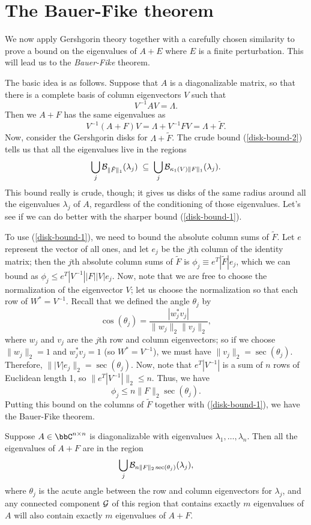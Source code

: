 \section{The Bauer-Fike theorem}

We now apply Gershgorin theory together with a carefully chosen
similarity to prove a bound on the eigenvalues of $A+E$ where $E$ is a
finite perturbation.  This will lead us to the {\em Bauer-Fike} theorem.

The basic idea is as follows.  Suppose that $A$ is a diagonalizable matrix, so
that there is a complete basis of column eigenvectors $V$ such that
\[
  V^{-1} A V = \Lambda.
\]
Then we $A+F$ has the same eigenvalues as
\[
  V^{-1} (A+F) V = \Lambda + V^{-1} F V = \Lambda + \tilde{F}.
\]
Now, consider the Gershgorin disks for $\Lambda + \tilde{F}$.
The crude bound (\ref{disk-bound-2}) tells us
that all the eigenvalues live in the regions
\[
  \bigcup_j \mathcal{B}_{\|\tilde{F}\|_1}(\lambda_j) \; \subseteq \;
  \bigcup_j \mathcal{B}_{\kappa_1(V) \|F\|_1}(\lambda_j).
\]
This bound really is crude, though; it gives us disks of the
same radius around all the eigenvalues $\lambda_j$ of $A$,
regardless of the conditioning of those eigenvalues.  Let's
see if we can do better with the sharper bound (\ref{disk-bound-1}).

To use (\ref{disk-bound-1}), we need to bound
the absolute column sums of $\tilde{F}$.  Let $e$ represent
the vector of all ones, and let $e_j$ be the $j$th column of
the identity matrix; then the $j$th absolute column sums of $\tilde{F}$
is $\phi_j \equiv e^T |\tilde{F}| e_j$, which we can bound
as $\phi_j \leq e^T |V^{-1}| |F| |V| e_j$.  Now, note that we
are free to choose the normalization of the eigenvector $V$;
let us choose the normalization so that each row of $W^* = V^{-1}$.
Recall that we defined the angle $\theta_j$ by
\[
  \cos(\theta_j) = \frac{|w_j^* v_j|}{\|w_j\|_2 \|v_j\|_2},
\]
where $w_j$ and $v_j$ are the $j$th row and column eigenvectors;
so if we choose $\|w_j\|_2 = 1$ and $w_j^* v_j = 1$ (so $W^* = V^{-1}$),
we must have $\|v_j\|_2 = \sec(\theta_j)$.  Therefore,
$\||V| e_j\|_2 = \sec(\theta_j)$.  Now, note that $e^T |V^{-1}|$ is
a sum of $n$ rows of Euclidean length 1, so $\|e^T |V^{-1}|\|_2 \leq n$.
Thus, we have
\[
  \phi_j \leq n \|F\|_2 \sec(\theta_j).
\]
Putting this bound on the columns of $\tilde{F}$ together with
(\ref{disk-bound-1}), we have the Bauer-Fike theorem.

\begin{theorem}
  Suppose $A \in \bbC^{n \times n}$ is diagonalizable with
  eigenvalues $\lambda_1, \ldots, \lambda_n$.
  Then all the eigenvalues of $A+F$ are in the region
  \[
    \bigcup_j \mathcal{B}_{n \|F\|_2 \sec(\theta_j)}(\lambda_j),
  \]
  where $\theta_j$ is the acute angle between the row and column eigenvectors
  for $\lambda_j$, and any connected component $\mathcal{G}$ of this region that
  contains exactly $m$ eigenvalues of $A$ will also contain exactly $m$
  eigenvalues of $A+F$.
\end{theorem}
